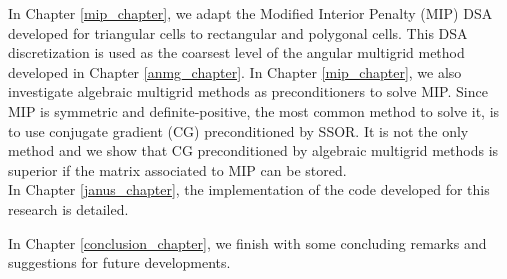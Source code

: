 \noindent In Chapter \ref{mip_chapter}, we adapt the Modified Interior 
Penalty (MIP) DSA developed for triangular cells to rectangular and polygonal 
cells. This DSA discretization is used as the coarsest level of the angular 
multigrid method developed in Chapter \ref{anmg_chapter}. In Chapter
\ref{mip_chapter}, we also investigate algebraic multigrid methods as 
preconditioners to solve MIP. Since MIP is symmetric and definite-positive, 
the most common method to solve it, is to use conjugate gradient (CG) 
preconditioned by SSOR. It is not the only method and we show that CG 
preconditioned by algebraic multigrid methods is superior if the matrix 
associated to MIP can be stored.\\

\noindent In Chapter \ref{janus_chapter}, the implementation of the code
developed for this research is detailed. 

\noindent In Chapter \ref{conclusion_chapter}, we finish with some concluding 
remarks and suggestions for future developments.
